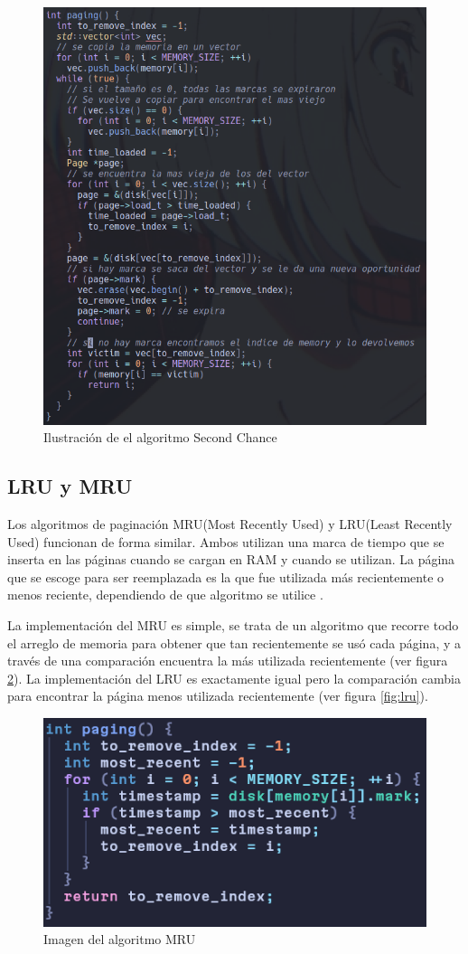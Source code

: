 \documentclass{report}
\begin{document}
\begin{figure}[h]
  \centering
  \includegraphics[width=0.8\linewidth]{figuras/second_chance.png}
  \caption{Ilustración de el algoritmo Second Chance}
  \label{fig:second_chance}
\end{figure}

\subsection{LRU y MRU}
Los algoritmos de paginación MRU(Most Recently Used) y LRU(Least Recently Used) funcionan de forma similar.  Ambos utilizan una marca de tiempo que se inserta en las páginas cuando se cargan en RAM y cuando se utilizan.  La página que se escoge para ser reemplazada es la que fue utilizada más recientemente o menos reciente, dependiendo de que algoritmo se utilice \cite{ref0}.

La implementación del MRU es simple, se trata de un algoritmo que recorre todo el arreglo de memoria para obtener que tan recientemente se usó cada página, y a través de una comparación encuentra la más utilizada recientemente (ver figura \ref{fig:mru}). La implementación del LRU es exactamente igual pero la comparación cambia para encontrar la página menos utilizada recientemente (ver figura \ref{fig:lru}).

\begin{figure}[h]
	\centering
	\includegraphics[width=0.8\linewidth]{figuras/mru.png}
	\caption{Imagen del algoritmo MRU}
	\label{fig:mru}
\end{figure}
\end{document}
